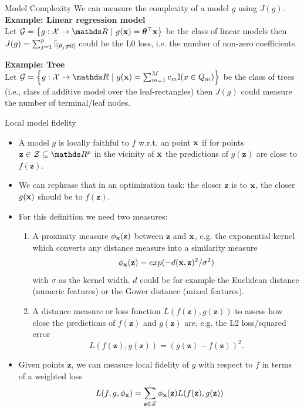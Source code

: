 \documentclass[11pt,compress,t,notes=noshow, xcolor=table]{beamer}
\newcommand{\Gspace}{\mathcal{G}}
\newcommand{\neigh}{\phi_{\xv}}
\newcommand{\zv}{\mathbf{z}}
\newcommand{\Zspace}{\mathcal{Z}}
\begin{document}
\begin{vbframe}{Model Complexity}
We can measure the complexity of a model $g$ using $J(g)$. \\ 
\vspace{0.5cm}
 	\textbf{Example: Linear regression model}\\
 	Let $\Gspace = \left\{g: \Xspace \to \R ~|~g(\xv) = \thetab^\top \xv\right\}$ be the class of linear models then $J(g) = \sum_{j = 1}^p \I_{[\theta_j \neq 0]}$ could be the L0 loss, i.e. the number of non-zero coefficients. 
 	\vspace{0.5cm}
 	
 	\textbf{Example: Tree}\\
 	Let $\Gspace = \left\{g:\Xspace \to \R ~|~g(\xv) = \sum_{m=1}^M c_m \I(x \in Q_m)\right\}$ be the class of trees (i.e., class of additive model over the leaf-rectangles) then $J(g)$ could measure the number of terminal/leaf nodes.\\
 	\end{vbframe}
 
 	\begin{vbframe}{Local model fidelity}
 		\begin{itemize}
 			\item A model $g$ is locally faithful to $f$ w.r.t. an point $\xv$ if for points $\zv \in \Zspace \subseteq \R^p$ in the vicinity of $\xv$ the predictions of $g(\zv)$ are close to $f(\zv)$. 
 			 \item We can rephrase that in an optimization task: the closer $\zv$ is to $\xv$, the closer $g(\xv)$ should be to $f(\zv)$.  
 			\item For this definition we need two measures:
 			\begin{enumerate}
 				\item A proximity measure $\neigh(\zv)$ between $\zv$ and $\xv$, e.g. the exponential kernel which converts any distance measure into a similarity measure 
 				$$\neigh(\zv) = exp(-d(\xv, \zv)^2/\sigma^2)$$ 
 				with $\sigma$ as the kernel width. $d$ could be for example the Euclidean distance (numeric features) or the Gower distance (mixed features). 
 				\item A distance measure or loss function $L(f(\zv), g(\zv))$ to assess how close the predictions of $f(\zv)$ and $g(\zv)$ are, e.g. the L2 loss/squared error $$L(f(\zv), g(\zv)) = (g(\zv) - f(\zv))^2.$$ 
 			\end{enumerate}
 			\item Given points $\zv$, we can measure local fidelity of $g$ with respect to $f$ in terms of a weighted loss
 			\begin{equation}
 				L(f, g, \neigh) = \sum_{\zv \in \Zspace} \neigh(\zv) L(f(\zv), g(\zv))
 				\label{eq:optim}
 			\end{equation}
 			
 		\end{itemize}
\end{vbframe}
\end{document}
